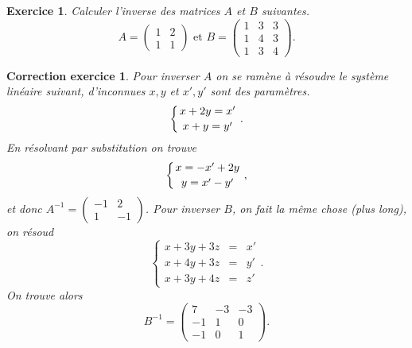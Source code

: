 \documentclass[12pt]{article}
\newtheorem{exercice}{\bf Exercice}
\newtheorem{correction}{\bf Correction exercice}
\newenvironment{exo}{
\begin{exercice}\smallskip\normalfont}{\end{exercice}
}
\newenvironment{cor}{
\begin{correction}\smallskip\normalfont}{\end{correction}
}
\newif\ifcorrige\corrigetrue
\begin{document}
\begin{exo}
Calculer l'inverse des matrices $A$ et $B$ suivantes.
$$A=\left ( \begin{array}{cc} 1&2\\1&1   \end{array}     \right) \text{  et  }
B=\left ( \begin{array}{ccc} 1&3&3\\1&4&3\\ 1&3&4  \end{array}     \right).$$
\end{exo}
\ifcorrige
\color{magenta}
\begin{cor} Pour inverser $A$ on se ram\`ene \`a r\'esoudre le syst\`eme lin\'eaire suivant, d'inconnues $x,y$ et $x',y'$ sont des param\`etres.
$$\left \{ x+2y=x' \atop x+y=y' \right. .$$
En r\'esolvant par substitution on trouve 
$$\left \{ x=-x'+2y \atop y=x'-y' \right. ,$$
et donc $A^{-1}=\left ( \begin{array}{cc} -1&2\\1&-1   \end{array}     \right)$. Pour inverser $B$, on fait la m\^eme chose (plus long), on r\'esoud
$$\left \{ \begin{array}{ccc}x+3y+3z&=&x'\\ x+4y+3z&=&y'\\ x+3y+4z&=&z' \end{array} \right. .$$
On trouve alors
$$ B^{-1}=\left ( \begin{array}{ccc} 7&-3&-3\\-1&1&0\\ -1&0&1  \end{array}     \right).$$
  $\qquad$   
    \end{cor}
\color{black}
\fi
\end{document}

